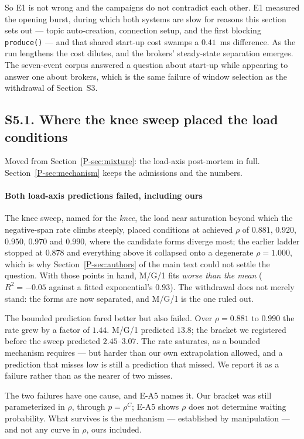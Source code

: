 \documentclass[10pt,journal,onecolumn]{IEEEtran}
\newcommand{\mainModeA}{\ref{P-sec:mechanism}}             %
\newcommand{\mainRareState}{\ref{P-sec:mixture}}       %
\newcommand{\mainAuthors}{\ref{P-sec:authors}}        %
\begin{document}
So E1 is not wrong and the campaigns do not contradict each other. E1 measured the opening burst,
during which both systems are slow for reasons this section sets out ---
topic auto-creation, connection setup, and the first blocking \texttt{produce()} --- and that
shared start-up cost swamps a $0.41$~ms difference. As the run lengthens the cost dilutes, and
the brokers' steady-state separation emerges. The seven-event corpus answered a question about
start-up while appearing to answer one about brokers, which is the same failure of window
selection as the withdrawal of Section~S3.






\subsection{S5.1. Where the knee sweep placed the load conditions}
Moved from Section~\mainRareState{}: the load-axis post-mortem in full. Section~\mainModeA{} keeps the admissions and the numbers.

\paragraph{Both load-axis predictions failed, including ours} The knee sweep, named for
the \emph{knee}, the load near saturation beyond which the negative-span rate climbs steeply, placed conditions at achieved $\rho$ of $0.881$, $0.920$, $0.950$, $0.970$ and $0.990$, where the candidate forms
diverge most; the earlier ladder stopped at $0.878$ and everything above it collapsed onto a
degenerate $\rho = 1.000$, which is why Section~\mainAuthors{} of the main text could not settle the question.
With those points in hand, M/G/1 fits \emph{worse than the mean} ($R^2 = -0.05$ against a fitted
exponential's $0.93$). The withdrawal does not merely stand: the forms are now separated, and
M/G/1 is the one ruled out.

The bounded prediction fared better but also failed. Over $\rho = 0.881$ to $0.990$ the rate grew
by a factor of $1.44$. M/G/1 predicted $13.8$; the bracket we registered before the sweep
predicted $2.45$--$3.07$. The rate saturates, as a bounded mechanism requires --- but harder than
our own extrapolation allowed, and a prediction that misses low is still a prediction that
missed. We report it as a failure rather than as the nearer of two misses.

The two failures have one cause, and E-A5 names it. Our bracket was still parameterized in
$\rho$, through $p = \rho^C$; E-A5 shows $\rho$ does not determine waiting probability. What survives is
the mechanism --- established by manipulation --- and not any curve in $\rho$, ours included.
\end{document}
